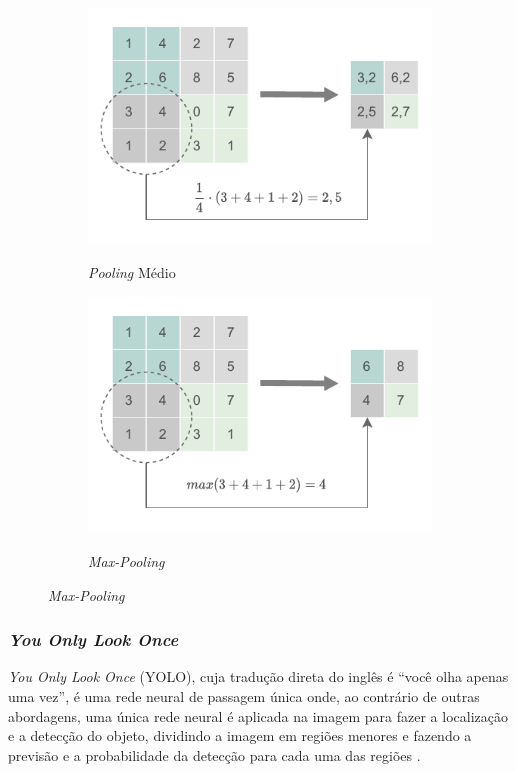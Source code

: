 \begin{figure}[h!]
    \centering
    \caption{Exemplos de funções utilizadas para operação de \textit{pooling}.}
    \begin{subfigure}[H]{.5\textwidth}
        \centering
        \caption{\textit{Pooling} Médio}
        \includegraphics[scale=1.1]{img/img-fundamentacao-av-pool.pdf}
        \label{fig:fund-pool-av}
    \end{subfigure}
    \begin{subfigure}[H]{.5\textwidth}
        \centering
        \caption{\textit{Max-Pooling}}
        \includegraphics[scale=1.1]{img/img-fundamentacao-max-pool.pdf}
        \label{fig:fund-pool-max}
    \end{subfigure}
	\label{fig:fund-pool}
\end{figure}

\subsubsection{\textit{You Only Look Once}} \label{cap:fund-ia-rn-yolo}
\textit{You Only Look Once} (YOLO), cuja tradução direta do inglês é ``você olha apenas uma vez'', é uma rede neural de passagem única \cite{ref:Yan} onde, ao contrário de outras abordagens, uma única rede neural é aplicada na imagem para fazer a localização e a detecção do objeto, dividindo a imagem em regiões menores e fazendo a previsão e a probabilidade da detecção para cada uma das regiões \cite{ref:Redmon-Farhadi}.


